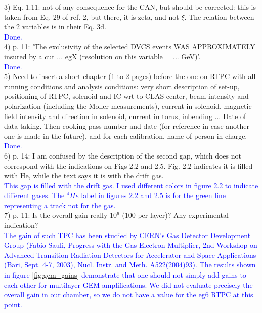 3) Eq. 1.11: not of any consequence for the CAN, but should be corrected:  this 
is taken from Eq. 29 of ref. 2, but there, it is zeta, and not $\xi$. The 
relation between the 2 variables is in their Eq. 3d. \\
\textcolor{blue}{   Done.}\\

4) p. 11: 'The exclusivity of the selected DVCS events WAS APPROXIMATELY 
insured by a cut ... egX (resolution on this variable = ... GeV)'. \\
\textcolor{blue}{Done.}\\


5) Need to insert a short chapter (1 to 2 pages) before the one on RTPC with all 
running conditions and analysis conditions: very short description of set-up, 
positioning of RTPC, solenoid and IC wrt to CLAS center, beam intensity and 
polarization (including the Moller measurements), current in solenoid, magnetic 
field intensity and direction in solenoid, current in torus, inbending ... Date 
of data taking. Then cooking pass number and date (for reference in case 
another one is made in the future), and for each calibration, name of person in 
charge.
\textcolor{blue}{Done.}\\


6) p. 14: I am confused by the description of the second gap, which does not 
correspond with the indications on Figs 2.2 and 2.5. Fig. 2.2 indicates it is 
filled with He, while the text says it is with the drift gas.\\
\textcolor{blue}{This gap is filled with the drift gas. I used different colors 
in figure 2.2 to indicate different gases. The $^{4}He$ label in figures 2.2 
and 2.5 is for the green line representing a track not for the gas. } \\

7) p. 11: Is the overall gain really 10$^6$ (100 per layer)? Any experimental 
indication?\\
\textcolor{blue}{
     The gain of such TPC has been studied by CERN's Gas Detector Development 
Group (Fabio Sauli, Progress with the Gas Electron Multiplier, 2nd Workshop on 
Advanced Transition Radiation Detectors for Accelerator and Space Applications 
(Bari, Sept. 4-7, 2003), Nucl. Instr. and Meth. A522(2004)93). The results 
shown in figure \ref{fig:gem_gains} demonstrate that one should not simply add 
gains to each other for multilayer GEM amplifications. We did not evaluate 
precisely the overall gain in our chamber, so we do not have a value for the 
eg6 RTPC at this point.}\\


